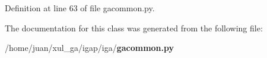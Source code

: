 \subsubsection{}\label{classiga_1_1gacommon_1_1CommonParams_e7c937c562abbb89252f992e22dff4e1}




Definition at line 63 of file gacommon.py.

The documentation for this class was generated from the following file:\begin{CompactItemize}
\item 
/home/juan/xul\_\-ga/igap/iga/{\bf gacommon.py}\end{CompactItemize}
